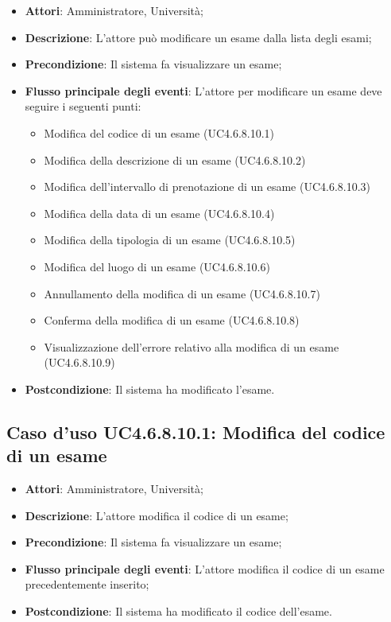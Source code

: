 \begin{itemize}
\item \textbf{Attori}: Amministratore, Università;
\item \textbf{Descrizione}: L'attore può modificare un esame dalla lista degli esami;

\item \textbf{Precondizione}: Il sistema fa visualizzare un esame;

\item \textbf{Flusso principale degli eventi}: L'attore per modificare un esame deve seguire i seguenti punti:

\begin{itemize}
\item Modifica del codice di un esame (UC4.6.8.10.1)
\item Modifica della descrizione di un esame (UC4.6.8.10.2)
\item Modifica dell’intervallo di prenotazione di un esame (UC4.6.8.10.3)
\item Modifica della data di un esame (UC4.6.8.10.4)
\item Modifica della tipologia di un esame (UC4.6.8.10.5)
\item Modifica del luogo di un esame (UC4.6.8.10.6)
\item Annullamento della modifica di un esame (UC4.6.8.10.7)
\item Conferma della modifica di un esame (UC4.6.8.10.8)
\item Visualizzazione dell'errore relativo alla modifica di un esame (UC4.6.8.10.9)
\end{itemize}
\item \textbf{Postcondizione}: Il sistema ha modificato l'esame.

\end{itemize}
\subsection{Caso d'uso \texorpdfstring{UC4.6.8.10.1}{UC4.6.8.10.1}: Modifica del codice di un esame}
\begin{itemize}
\item \textbf{Attori}: Amministratore, Università;
\item \textbf{Descrizione}: L'attore modifica il codice di un esame;

\item \textbf{Precondizione}: Il sistema fa visualizzare un esame;


\item \textbf{Flusso principale degli eventi}: L'attore modifica il codice di un esame precedentemente inserito;

\item \textbf{Postcondizione}: Il sistema ha modificato il codice dell’esame.

\end{itemize}
